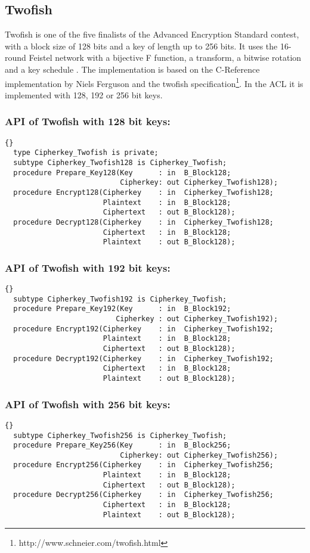 \subsection{Twofish}
Twofish is one of the five finalists of the Advanced Encryption
Standard contest, with a block size of 128 bits and a key of length up
to 256 bits. It uses the 16-round Feistel network with a bijective F
function, a transform, a bitwise rotation and a key schedule
\cite{Twofish}. The implementation is based on the C-Reference
implementation by Niels Ferguson and the twofish
specification\footnote{http://www.schneier.com/twofish.html}. In the
ACL it is implemented with 128, 192 or 256 bit keys.
\subsubsection*{API of Twofish with 128 bit keys:}
\begin{lstlisting}{}
  type Cipherkey_Twofish is private;
  subtype Cipherkey_Twofish128 is Cipherkey_Twofish;
  procedure Prepare_Key128(Key      : in  B_Block128;
                           Cipherkey: out Cipherkey_Twofish128);
  procedure Encrypt128(Cipherkey    : in  Cipherkey_Twofish128;
                       Plaintext    : in  B_Block128;
                       Ciphertext   : out B_Block128);
  procedure Decrypt128(Cipherkey    : in  Cipherkey_Twofish128;
                       Ciphertext   : in  B_Block128;
                       Plaintext    : out B_Block128);
\end{lstlisting}
\subsubsection*{API of Twofish with 192 bit keys:}
\begin{lstlisting}{}
  subtype Cipherkey_Twofish192 is Cipherkey_Twofish;
  procedure Prepare_Key192(Key      : in  B_Block192;
                          Cipherkey : out Cipherkey_Twofish192);
  procedure Encrypt192(Cipherkey    : in  Cipherkey_Twofish192;
                       Plaintext    : in  B_Block128;
                       Ciphertext   : out B_Block128);
  procedure Decrypt192(Cipherkey    : in  Cipherkey_Twofish192;
                       Ciphertext   : in  B_Block128;
                       Plaintext    : out B_Block128);
\end{lstlisting}
\subsubsection*{API of Twofish with 256 bit keys:}
\begin{lstlisting}{}
  subtype Cipherkey_Twofish256 is Cipherkey_Twofish;
  procedure Prepare_Key256(Key      : in  B_Block256;
                           Cipherkey: out Cipherkey_Twofish256);
  procedure Encrypt256(Cipherkey    : in  Cipherkey_Twofish256;
                       Plaintext    : in  B_Block128;
                       Ciphertext   : out B_Block128);
  procedure Decrypt256(Cipherkey    : in  Cipherkey_Twofish256;
                       Ciphertext   : in  B_Block128;
                       Plaintext    : out B_Block128);
\end{lstlisting}

